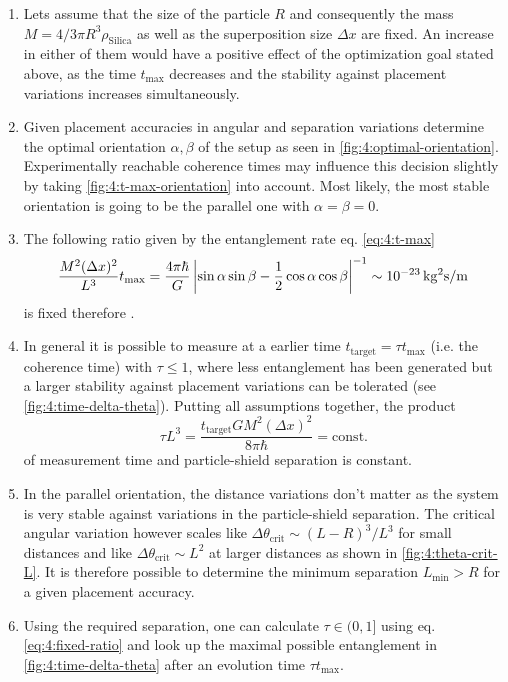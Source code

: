 \begin{enumerate}
  \item Lets assume that the size of the particle $R$ and consequently the mass $M=4/3 \pi R^3 \rho_\mathrm{Silica}$ as well as the superposition size $\Delta x$ are fixed. An increase in either of them would have a positive effect of the optimization goal stated above, as the time $t_\mathrm{max}$ decreases and the stability against placement variations increases simultaneously.
  \item Given placement accuracies in angular and separation variations determine the optimal orientation $\alpha,\beta$ of the setup as seen in \cref{fig:4:optimal-orientation}. Experimentally reachable coherence times may influence this decision slightly by taking \cref{fig:4:t-max-orientation} into account. Most likely, the most stable orientation is going to be the parallel one with $\alpha = \beta = 0$.
  \item The following ratio given by the entanglement rate eq. \eqref{eq:4:t-max}
  \begin{equation}
    \frac{M^2 (\Delta x)^2}{L^3}t_\mathrm{max} = \frac{4 \pi \hbar}{G}\left\lvert\sin\alpha\sin\beta-\frac{1}{2}\cos\alpha\cos\beta\right\rvert^{-1} \sim 10^{-23} \, \mathrm{kg^2 s/m}
  \end{equation} 
  is fixed therefore \cite{Aspelmeyer_2024}.
  \item In general it is possible to measure at a earlier time $t_\mathrm{target} = \tau t_\mathrm{max}$ (i.e. the coherence time) with $\tau \leq 1$, where less entanglement has been generated but a larger stability against placement variations can be tolerated (see \cref{fig:4:time-delta-theta}). Putting all assumptions together, the product
  \begin{equation}\label{eq:4:fixed-ratio}
    \tau L^3 = \frac{t_\mathrm{target} G M^2 (\Delta x)^2}{8\pi \hbar} = \mathrm{const.}
  \end{equation}
  of measurement time and particle-shield separation is constant.
  \item In the parallel orientation, the distance variations don't matter as the system is very stable against variations in the particle-shield separation. The critical angular variation however scales like $\Delta \theta_\mathrm{crit} \sim (L-R)^3/L^3$ for small distances and like $\Delta \theta_\mathrm{crit} \sim L^2$ at larger distances as shown in \cref{fig:4:theta-crit-L}. It is therefore possible to determine the minimum separation $L_\mathrm{min} > R$ for a given placement accuracy.
  \item Using the required separation, one can calculate $\tau \in (0, 1]$ using eq. \eqref{eq:4:fixed-ratio} and look up the maximal possible entanglement in \cref{fig:4:time-delta-theta} after an evolution time $\tau t_\mathrm{max}$.
\end{enumerate}
